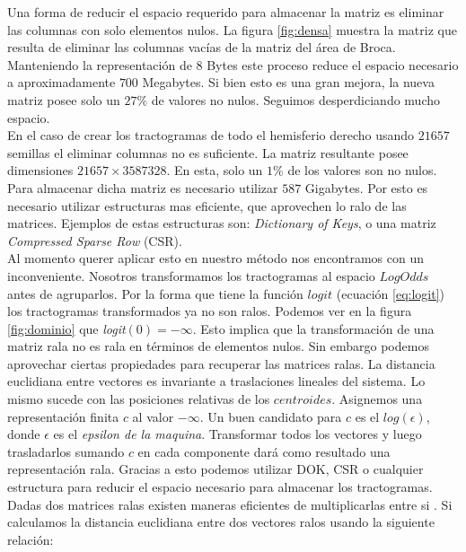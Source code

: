 Una forma de reducir el espacio requerido para almacenar la matriz es 
eliminar las columnas con solo elementos nulos. La figura \ref{fig:densa}
muestra la matriz que resulta de eliminar las columnas vac\'ias de la matriz
del \'area de Broca. Manteniendo la representaci\'on de $8$ Bytes este
proceso reduce el espacio necesario a aproximadamente $700$ Megabytes.
Si bien esto es una gran mejora, la nueva matriz posee solo un $27\%$ de
valores no nulos. Seguimos desperdiciando mucho espacio. \\

En el caso de crear los tractogramas de todo el hemisferio derecho usando
$21657$ semillas el eliminar columnas no es suficiente. La matriz
resultante posee dimensiones $21657\times3587328$. En esta, solo un $1\%$
de los valores son no nulos. Para almacenar dicha matriz es necesario
utilizar $587$ Gigabytes. Por esto es necesario utilizar estructuras mas
eficiente, que aprovechen lo ralo de las matrices. Ejemplos de estas
estructuras son: \textit{Dictionary of Keys}, o una matriz 
\textit{Compressed Sparse Row} (CSR). \\


Al momento querer aplicar esto en nuestro m\'etodo nos encontramos con un
inconveniente. Nosotros transformamos los tractogramas al espacio $LogOdds$
antes de agruparlos. Por la forma que tiene la funci\'on $logit$ 
(ecuaci\'on \ref{eq:logit}) los tractogramas transformados ya no son ralos. 
Podemos ver en la figura \ref{fig:dominio} que 
\textit{logit}$(0) = -\infty$. Esto implica que la transformaci\'on de una
matriz rala no es rala en t\'erminos de elementos nulos. Sin embargo
podemos aprovechar ciertas propiedades para recuperar las matrices ralas.
La distancia euclidiana entre vectores es invariante a traslaciones lineales
del sistema. Lo mismo sucede con las posiciones relativas de los
$centroides$. Asignemos una representaci\'on finita $c$ al valor $-\infty$.
Un buen candidato para $c$ es el $log(\epsilon)$, donde $\epsilon$ es el
\textit{epsilon de la maquina}. Transformar todos los vectores y luego
trasladarlos sumando $c$ en cada componente dar\'a como resultado una
representaci\'on rala. Gracias a esto podemos utilizar DOK, CSR o cualquier
estructura para reducir el espacio necesario para almacenar los
tractogramas. \\

Dadas dos matrices ralas existen maneras eficientes de multiplicarlas entre
si \cite{Bank1993}. Si calculamos la distancia euclidiana entre dos vectores
ralos usando la siguiente relaci\'on: 

